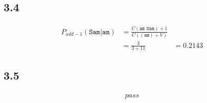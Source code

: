\documentclass{article}
\begin{document}
\subsection*{3.4}

\paragraph{}
\begin{align*}
    P_{add-1}(\texttt{Sam|am}) & = \frac{C(\texttt{am Sam}) + 1}{C((\texttt{am}) + V)} \\
    & = \frac{3}{3 + 11}
    & = 0.2143
\end{align*}

\subsection*{3.5}

\paragraph*{}
\begin{align*}
    pass
\end{align*}


\subsection*{}
\end{document}
